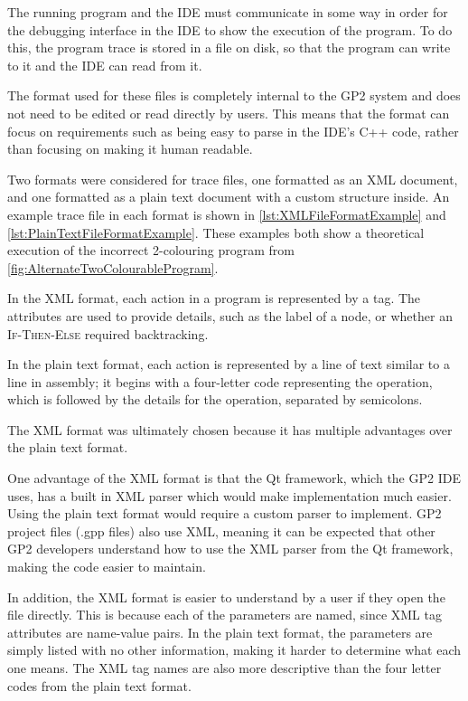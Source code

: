 \documentclass[authoryearcitations]{UoYCSproject}
\newcommand{\includecode}[4][c]{}
\begin{document}
The running program and the IDE must communicate in some way in order for the
debugging interface in the IDE to show the execution of the program. To do this,
the program trace is stored in a file on disk, so that the program can write to
it and the IDE can read from it.

The format used for these files is completely internal to the GP2 system and
does not need to be edited or read directly by users. This means that the format
can focus on requirements such as being easy to parse in the IDE's C++ code,
rather than focusing on making it human readable.

Two formats were considered for trace files, one formatted as an XML document,
and one formatted as a plain text document with a custom structure inside. An
example trace file in each format is shown in \autoref{lst:XMLFileFormatExample}
and \autoref{lst:PlainTextFileFormatExample}. These examples both show a
theoretical execution of the incorrect 2-colouring program from
\autoref{fig:AlternateTwoColourableProgram}.

\includecode[xml]{xmltraceexample.xml}{XML based trace file example}{lst:XMLFileFormatExample}

\includecode{plaintraceexample.txt}{Plain text trace file example}{lst:PlainTextFileFormatExample}

In the XML format, each action in a program is represented by a tag. The
attributes are used to provide details, such as the label of a node, or whether
an \textsc{If-Then-Else} required backtracking.

In the plain text format, each action is represented by a line of text similar
to a line in assembly; it begins with a four-letter code representing the
operation, which is followed by the details for the operation, separated by
semicolons.

The XML format was ultimately chosen because it has multiple advantages over the
plain text format.

One advantage of the XML format is that the Qt framework, which the GP2 IDE uses,
has a built in XML parser which would make implementation much easier. Using the
plain text format would require a custom parser to implement. GP2 project files
(.gpp files) also use XML, meaning it can be expected that other GP2 developers
understand how to use the XML parser from the Qt framework, making the code
easier to maintain.

In addition, the XML format is easier to understand by a user if they open the
file directly. This is because each of the parameters are named, since XML tag
attributes are name-value pairs. In the plain text format, the parameters are
simply listed with no other information, making it harder to determine what
each one means. The XML tag names are also more descriptive than the four letter
codes from the plain text format.
\end{document}
